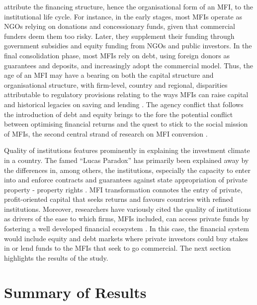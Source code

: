 \documentclass[a4paper,nobind]{templates/ociamthesis}
\begin{document}
\textcite{ledgerwood2006transforming} attribute the financing structure, hence the organisational form of an MFI, to the institutional life cycle. For instance, in the early stages, most MFIs operate as NGOs relying on donations and concessionary funds, given that commercial funders deem them too risky. Later, they supplement their funding through government subsidies and equity funding from NGOs and public investors. In the final consolidation phase, most MFIs rely on debt, using foreign donors as guarantees and deposits, and increasingly adopt the commercial model. Thus, the age of an MFI may have a bearing on both the capital structure and organisational structure, with firm-level, country and regional, disparities attributable to regulatory provisions relating to the ways MFIs can raise capital and historical legacies on saving and lending \autocite{bayai2016financing}. The agency conflict that follows the introduction of debt and equity brings to the fore the potential conflict between optimising financial returns and the quest to stick to the social mission of MFIs, the second central strand of research on MFI conversion \autocite{nurmakhanova2015trade,bayai2016financing,abdulai2017trade,awaworyi2018sustainability}.

Quality of institutions features prominently in explaining the investment climate in a country. The famed ``Lucas Paradox'' has primarily been explained away by the differences in, among others, the institutions, especially the capacity to enter into and enforce contracts and guarantees against state appropriation of private property - property rights \autocite{azemar2013has,goktan2015explanation}. MFI transformation connotes the entry of private, profit-oriented capital that seeks returns and favours countries with refined institutions. Moreover, researchers have variously cited the quality of institutions as drivers of the ease to which firms, MFIs included, can access private funds by fostering a well developed financial ecosystem \autocite{huang2010political,kaidi2019financial}. In this case, the financial system would include equity and debt markets where private investors could buy stakes in or lend funds to the MFIs that seek to go commercial. The next section highlights the results of the study.

\hypertarget{summary-of-results}{%
\section{Summary of Results}\label{summary-of-results}}
\end{document}

